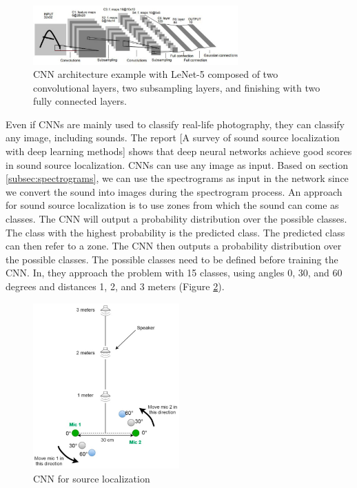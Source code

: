 \begin{figure}[H]
    \centering
    \includegraphics[width=0.7\textwidth]{../Images/cnn_example.png}
    \caption{CNN architecture example with LeNet-5 \protect\cite{726791} composed of two convolutional layers, two subsampling layers, and finishing with two fully connected layers.}
    \label{fig:cnn_example}
\end{figure}



Even if CNNs are mainly used to classify real-life photography, they can classify any image, including sounds. The report [A survey of sound source localization with deep learning methods]\cite{Grumiaux_2022} shows that deep neural networks achieve good scores in sound source localization. CNNs can use any image as input. Based on section \ref*{subsec:spectrograms}, we can use the spectrograms as input in the network since we convert the sound into images during the spectrogram process. An approach for sound source localization is to use zones from which the sound can come as classes. The CNN will output a probability distribution over the possible classes. The class with the highest probability is the predicted class. The predicted class can then refer to a zone. The CNN then outputs a probability distribution over the possible classes. The possible classes need to be defined before training the CNN. In\cite{s20010172}, they approach the problem with 15 classes, using angles 0, 30, and 60 degrees and distances 1, 2, and 3 meters (Figure \ref*{fig:Yiwere_classes}).

\begin{figure}[H]
    \centering
    \includegraphics[width=0.5\textwidth]{../Images/Yiwere_classes.png}
    \caption{CNN for source localization}
    \label{fig:Yiwere_classes}
\end{figure}

